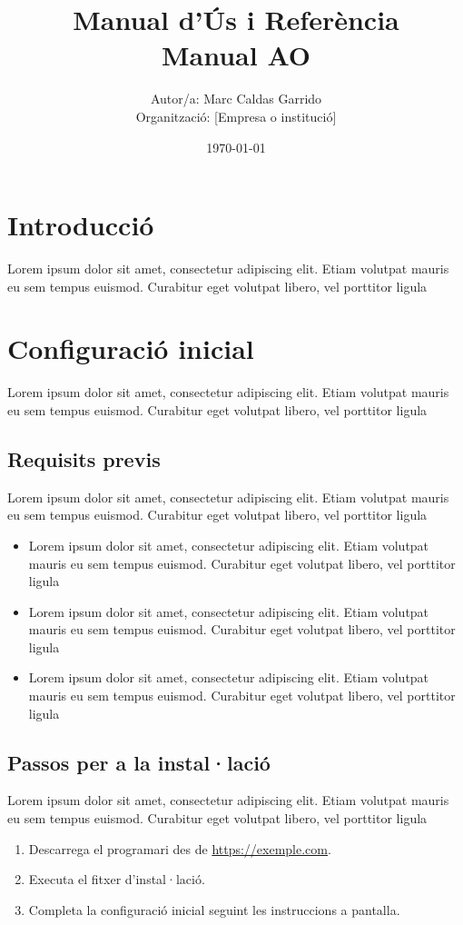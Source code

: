 \documentclass[a4paper,12pt]{article}
\title{\textbf{Manual d'Ús i Referència} \\ \large Manual AO}
\author{Autor/a: Marc Caldas Garrido \\ Organització: [Empresa o institució]}
\date{\today}
\begin{document}
\maketitle
\thispagestyle{empty} %
\newpage

\tableofcontents
\newpage

\section{Introducció}
Lorem ipsum dolor sit amet, consectetur adipiscing elit. Etiam volutpat mauris eu sem tempus euismod. Curabitur eget volutpat libero, vel porttitor ligula

\section{Configuració inicial}
Lorem ipsum dolor sit amet, consectetur adipiscing elit. Etiam volutpat mauris eu sem tempus euismod. Curabitur eget volutpat libero, vel porttitor ligula

\subsection{Requisits previs}
Lorem ipsum dolor sit amet, consectetur adipiscing elit. Etiam volutpat mauris eu sem tempus euismod. Curabitur eget volutpat libero, vel porttitor ligula
\begin{itemize}
    \item Lorem ipsum dolor sit amet, consectetur adipiscing elit. Etiam volutpat mauris eu sem tempus euismod. Curabitur eget volutpat libero, vel porttitor ligula
    \item Lorem ipsum dolor sit amet, consectetur adipiscing elit. Etiam volutpat mauris eu sem tempus euismod. Curabitur eget volutpat libero, vel porttitor ligula
    \item Lorem ipsum dolor sit amet, consectetur adipiscing elit. Etiam volutpat mauris eu sem tempus euismod. Curabitur eget volutpat libero, vel porttitor ligula
\end{itemize}

\subsection{Passos per a la instal·lació}
Lorem ipsum dolor sit amet, consectetur adipiscing elit. Etiam volutpat mauris eu sem tempus euismod. Curabitur eget volutpat libero, vel porttitor ligula
\begin{enumerate}
    \item Descarrega el programari des de \url{https://exemple.com}.
    \item Executa el fitxer d’instal·lació.
    \item Completa la configuració inicial seguint les instruccions a pantalla.
\end{enumerate}
\end{document}
